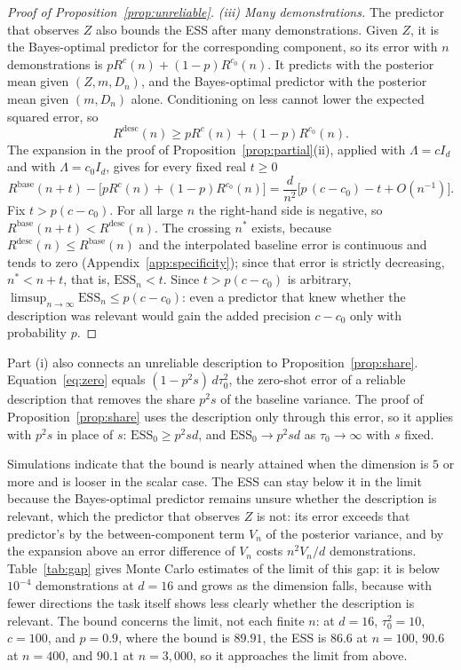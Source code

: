 \documentclass{article}
\theoremstyle{definition}
\newcommand{\ess}{\mathrm{ESS}}
\begin{document}
\begin{proof}[Proof of Proposition~\ref{prop:unreliable}]
\emph{(iii) Many demonstrations.}
The predictor that observes $Z$ also bounds the ESS after many demonstrations. Given $Z$, it is the Bayes-optimal predictor for the corresponding component, so its error with $n$ demonstrations is $pR^{c}(n)+(1-p)R^{c_0}(n)$. It predicts with the posterior mean given $(Z,m,D_n)$, and the Bayes-optimal predictor with the posterior mean given $(m,D_n)$ alone. Conditioning on less cannot lower the expected squared error, so
\[
R^{\mathrm{desc}}(n)\ge pR^{c}(n)+(1-p)R^{c_0}(n).
\]
The expansion in the proof of Proposition~\ref{prop:partial}(ii), applied with $\Lambda=cI_d$ and with $\Lambda=c_0I_d$, gives for every fixed real $t\ge0$
\[
R^{\mathrm{base}}(n+t)-\big[pR^{c}(n)+(1-p)R^{c_0}(n)\big]
=\frac{d}{n^2}\Big[p\,(c-c_0)-t+O(n^{-1})\Big].
\]
Fix $t>p(c-c_0)$. For all large $n$ the right-hand side is negative, so $R^{\mathrm{base}}(n+t)<R^{\mathrm{desc}}(n)$. The crossing $n^*$ exists, because $R^{\mathrm{desc}}(n)\le R^{\mathrm{base}}(n)$ and the interpolated baseline error is continuous and tends to zero (Appendix~\ref{app:specificity}); since that error is strictly decreasing, $n^*<n+t$, that is, $\ess_n<t$. Since $t>p(c-c_0)$ is arbitrary, $\limsup_{n\to\infty}\ess_n\le p(c-c_0)$: even a predictor that knew whether the description was relevant would gain the added precision $c-c_0$ only with probability $p$.
\end{proof}

Part (i) also connects an unreliable description to Proposition~\ref{prop:share}. Equation~\eqref{eq:zero} equals $(1-p^2s)\,d\tau_0^2$, the zero-shot error of a reliable description that removes the share $p^2s$ of the baseline variance. The proof of Proposition~\ref{prop:share} uses the description only through this error, so it applies with $p^2s$ in place of $s$: $\ess_0\ge p^2sd$, and $\ess_0\to p^2sd$ as $\tau_0\to\infty$ with $s$ fixed.

Simulations indicate that the bound is nearly attained when the dimension is $5$ or more and is looser in the scalar case. The ESS can stay below it in the limit because the Bayes-optimal predictor remains unsure whether the description is relevant, which the predictor that observes $Z$ is not: its error exceeds that predictor's by the between-component term $V_n$ of the posterior variance, and by the expansion above an error difference of $V_n$ costs $n^2V_n/d$ demonstrations. Table~\ref{tab:gap} gives Monte Carlo estimates of the limit of this gap: it is below $10^{-4}$ demonstrations at $d=16$ and grows as the dimension falls, because with fewer directions the task itself shows less clearly whether the description is relevant. The bound concerns the limit, not each finite $n$: at $d=16$, $\tau_0^2=10$, $c=100$, and $p=0.9$, where the bound is $89.91$, the ESS is $86.6$ at $n=100$, $90.6$ at $n=400$, and $90.1$ at $n=3{,}000$, so it approaches the limit from above.
\end{document}
